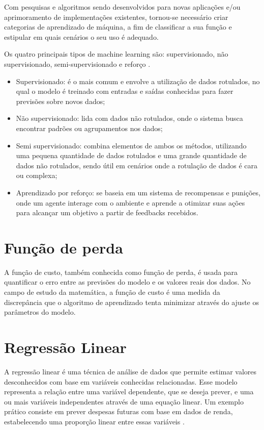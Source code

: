 Com pesquisas e algoritmos sendo desenvolvidos para novas aplicações e/ou aprimoramento de implementações existentes, tornou-se necessário criar categorias de aprendizado de máquina, a fim de classificar a sua função e estipular em quais cenários o seu uso é adequado.

Os quatro principais tipos de machine learning são: supervisionado, não supervisionado, semi-supervisionado e reforço \cite{saravanan2018}. 

\begin{itemize}
    \item Supervisionado: é o mais comum e envolve a utilização de dados rotulados, no qual o modelo é treinado com entradas e saídas conhecidas para fazer previsões sobre novos dados;
    \item Não supervisionado: lida com dados não rotulados, onde o sistema busca encontrar padrões ou agrupamentos nos dados;
    \item Semi supervisionado: combina elementos de ambos os métodos, utilizando uma pequena quantidade de dados rotulados e uma grande quantidade de dados não rotulados, sendo útil em cenários onde a rotulação de dados é cara ou complexa;
    \item Aprendizado por reforço: se baseia em um sistema de recompensas e punições, onde um agente interage com o ambiente e aprende a otimizar suas ações para alcançar um objetivo a partir de feedbacks recebidos.
\end{itemize}

\section{Função de perda}

A função de custo, também conhecida como função de perda, é usada para quantificar o erro entre as previsões do modelo e os valores reais dos dados. No campo de estudo da matemática, a função de custo é uma medida da discrepância que o algoritmo de aprendizado tenta minimizar através do ajuste os parâmetros do modelo.

\section{Regressão Linear}

A regressão linear é uma técnica de análise de dados que permite estimar valores desconhecidos com base em variáveis conhecidas relacionadas. Esse modelo representa a relação entre uma variável dependente, que se deseja prever, e uma ou mais variáveis independentes através de uma equação linear. Um exemplo prático consiste em prever despesas futuras com base em dados de renda, estabelecendo uma proporção linear entre essas variáveis \cite{aws2024}.

